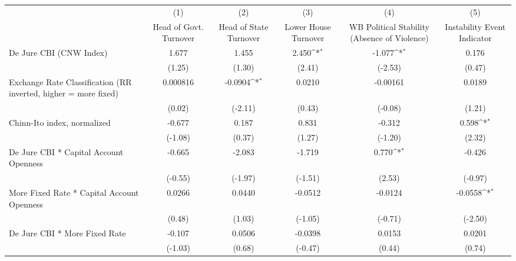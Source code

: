 {
\def\sym#1{\ifmmode^{#1}\else\(^{#1}\)\fi}
\begin{tabular}{l*{5}{c}}
\hline\hline
                &\multicolumn{1}{c}{(1)}&\multicolumn{1}{c}{(2)}&\multicolumn{1}{c}{(3)}&\multicolumn{1}{c}{(4)}&\multicolumn{1}{c}{(5)}\\
                &\multicolumn{1}{c}{Head of Govt. Turnover}&\multicolumn{1}{c}{Head of State Turnover}&\multicolumn{1}{c}{Lower House Turnover}&\multicolumn{1}{c}{WB Political Stability (Absence of Violence)}&\multicolumn{1}{c}{Instability Event Indicator}\\
\hline
De Jure CBI (CNW Index)&    1.677         &    1.455         &    2.450\sym{*}  &   -1.077\sym{*}  &    0.176         \\
                &   (1.25)         &   (1.30)         &   (2.41)         &  (-2.53)         &   (0.47)         \\
[1em]
Exchange Rate Classification (RR inverted, higher = more fixed)& 0.000816         &  -0.0904\sym{*}  &   0.0210         & -0.00161         &   0.0189         \\
                &   (0.02)         &  (-2.11)         &   (0.43)         &  (-0.08)         &   (1.21)         \\
[1em]
Chinn-Ito index, normalized&   -0.677         &    0.187         &    0.831         &   -0.312         &    0.598\sym{*}  \\
                &  (-1.08)         &   (0.37)         &   (1.27)         &  (-1.20)         &   (2.32)         \\
[1em]
De Jure CBI * Capital Account Openness&   -0.665         &   -2.083         &   -1.719         &    0.770\sym{*}  &   -0.426         \\
                &  (-0.55)         &  (-1.97)         &  (-1.51)         &   (2.53)         &  (-0.97)         \\
[1em]
More Fixed Rate * Capital Account Openness&   0.0266         &   0.0440         &  -0.0512         &  -0.0124         &  -0.0558\sym{*}  \\
                &   (0.48)         &   (1.03)         &  (-1.05)         &  (-0.71)         &  (-2.50)         \\
[1em]
De Jure CBI * More Fixed Rate&   -0.107         &   0.0506         &  -0.0398         &   0.0153         &   0.0201         \\
                &  (-1.03)         &   (0.68)         &  (-0.47)         &   (0.44)         &   (0.74)         \\

\end{tabular}}
